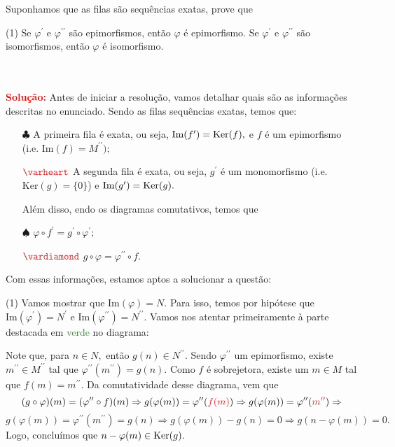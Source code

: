 \documentclass[11pt,a4paper]{article}
\newcommand{\dividiritens}[1]{\begin{tasks}[counter-format={(tsk[a])},label-width=3.6ex, label-format = {\bfseries}, column-sep = {0pt}](1) #1 \end{tasks}}
\newcommand{\pers}[1]{\textcolor{Floresta}{$\negrito{(#1)} $}}
\newcommand{\solucao}[1]{
\textbf{\textcolor{white}{oi}\\ \\ \textcolor{red}{Solução:}} #1}
\begin{document}
Suponhamos que as filas são sequências exatas, prove que
\dividiritens{
\task[\pers{a}] Se $\varphi^\prime$ e $\varphi^{\prime \prime}$ são epimorfismos, então $\varphi$ é epimorfismo.
\task[\pers{b}] Se $\varphi^\prime$ e $\varphi^{\prime \prime}$ são isomorfismos, então $\varphi$ é isomorfismo.
}
\solucao{
Antes de iniciar a resolução, vamos detalhar quais são as informações descritas no enunciado. Sendo as filas sequências exatas, temos que:
\begin{itemize}
    \item[$\clubsuit$] A primeira fila é exata, ou seja, $\mbox{Im}(f^{\prime}) = {\rm Ker}(f),$ e $f$ é um epimorfismo (i.e. $\mbox{Im}(f) = M^{\prime \prime});$
    \item[$\textcolor{Red}{\varheart}$] A segunda fila é exata, ou seja, $g^{\prime}$ é um monomorfismo (i.e. $\mbox{Ker}(g) = \{ 0 \}$) e $\mbox{Im}(g^{\prime}) = {\rm Ker}(g).$
    
Além disso, endo os diagramas comutativos, temos que
    \item[$\spadesuit$] $\varphi \circ f^{\prime}= g^{\prime} \circ \varphi^{\prime};$
    \item[$\textcolor{Red}{\vardiamond}$] $g \circ \varphi = \varphi^{\prime \prime} \circ f.$
\end{itemize}

Com essas informações, estamos aptos a solucionar a questão:
\dividiritens{
\task[\pers{a}] Vamos mostrar que $\mbox{Im}(\varphi) = N.$ Para isso, temos por hipótese que $\mbox{Im}(\varphi^{\prime}) = N^{\prime}$ e $\mbox{Im}(\varphi^{\prime \prime}) = N^{\prime \prime}.$
Vamos nos atentar primeiramente à parte destacada em \textcolor{ForestGreen}{verde} no diagrama:
}
}
\begin{center}
\end{center}
Note que, para $n \in N,$ então $g(n) \in N^{\prime \prime}.$ Sendo $\varphi^{\prime \prime}$ um epimorfismo, existe $m^{\prime \prime} \in M^{\prime \prime}$ tal que $\varphi^{\prime \prime} (m^{\prime \prime}) = g(n).$ Como $f$ é sobrejetora, existe um $m \in M$ tal que $f(m) = m^{\prime \prime}.$ Da comutatividade desse diagrama, vem que
\[
(g \circ \varphi)(m) = (\varphi^{\prime \prime} \circ f)(m) \Rightarrow g(\varphi(m)) = \varphi^{\prime \prime}(\textcolor{Red}{f(m)}) \Rightarrow g(\varphi(m)) = \varphi^{\prime \prime}(\textcolor{Red}{m^{\prime \prime}})  \Rightarrow \]\[g(\varphi(m)) = \varphi^{\prime \prime}(m^{\prime \prime}) = g(n) \Rightarrow g(\varphi(m)) - g(n) = 0 \Rightarrow g(n - \varphi(m)) = 0.
\]
Logo, concluímos que $n - \varphi(m) \in {\rm Ker}(g).$
\end{document}
